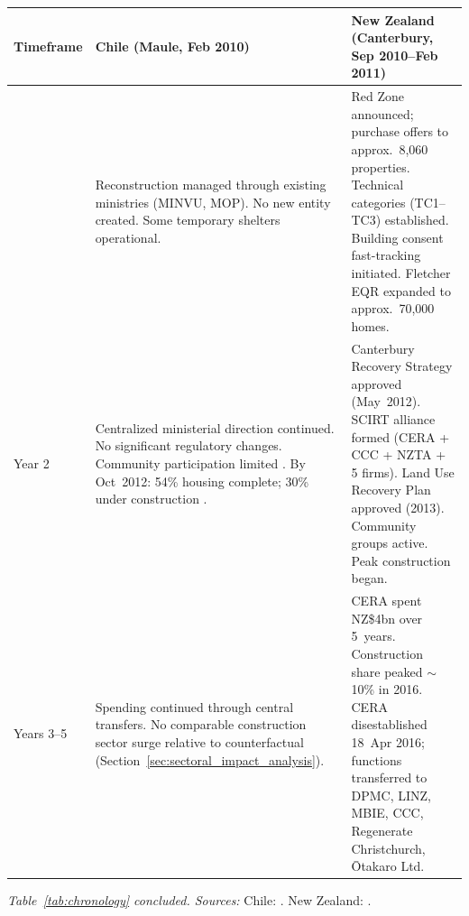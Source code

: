 \documentclass[12pt]{article}
\begin{document}
\begin{table}[!htbp]
\centering
\footnotesize
\begin{tabular}{@{}
  >{\raggedright\arraybackslash}p{}
  >{\raggedright\arraybackslash}p{}
  >{\raggedright\arraybackslash}p{}
@{}}
\toprule
\textbf{Timeframe} &
\textbf{Chile (Maule, Feb 2010)} &
\textbf{New Zealand (Canterbury, Sep 2010--Feb 2011)} \\
\midrule

{Months 6--12} &
Reconstruction managed through existing ministries (MINVU, MOP). No new entity created. Some temporary shelters operational. &
Red Zone announced; purchase offers to approx.\ 8,060 properties. Technical categories (TC1--TC3) established. Building consent fast-tracking initiated. Fletcher EQR expanded to approx.\ 70,000 homes. \\
\addlinespace

{Year 2} &
Centralized ministerial direction continued. No significant regulatory changes. Community participation limited \parencite{CardenasJiron2012}. By Oct~2012: 54\% housing complete; 30\% under construction \parencite{Platt2019}. &
Canterbury Recovery Strategy approved (May~2012). SCIRT alliance formed (CERA + CCC + NZTA + 5 firms). Land Use Recovery Plan approved (2013). Community groups active. Peak construction began. \\
\addlinespace

{Years 3--5} &
Spending continued through central transfers. No comparable construction sector surge relative to counterfactual (Section~\ref{sec:sectoral_impact_analysis}). &
CERA spent NZ\$4bn over 5~years. Construction share peaked ${\sim}$10\% in 2016. CERA disestablished 18~Apr 2016; functions transferred to DPMC, LINZ, MBIE, CCC, Regenerate Christchurch, {\=O}takaro Ltd. \\

\bottomrule
\end{tabular}

\vspace{2pt}
{\scriptsize \textit{Table~\ref{tab:chronology} concluded. Sources:} Chile: \parencite{eclac2010overview,Platt2019,Comerio2013,CRS2010}. New Zealand: \parencite{AuditorGeneral2017,CERAA2011,ICNZ2024,eqc2017annual,GrubeStorr2018,Wilson2016}.}
\end{table}


\end{document}
